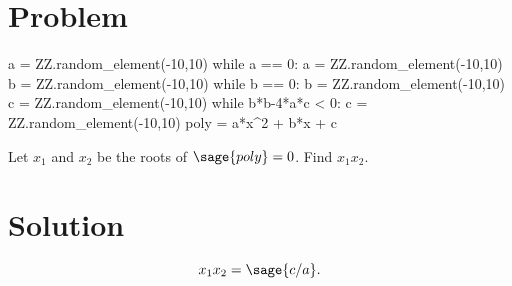 \documentclass{article}
\begin{document}
\section{Problem}

\begin{sagesilent}
a = ZZ.random_element(-10,10)
while a == 0:
   a = ZZ.random_element(-10,10)
b = ZZ.random_element(-10,10)
while b == 0:
   b = ZZ.random_element(-10,10)
c = ZZ.random_element(-10,10)
while b*b-4*a*c < 0:
  c = ZZ.random_element(-10,10)
poly = a*x^2 + b*x + c
\end{sagesilent}

Let \(x_1\) and \(x_2\) be the roots of \(\sage{poly}=0\). 
Find  \(x_1x_2\).

\section{Solution}
\[
x_1x_2=\sage{c/a}.
\]

\end{document}
